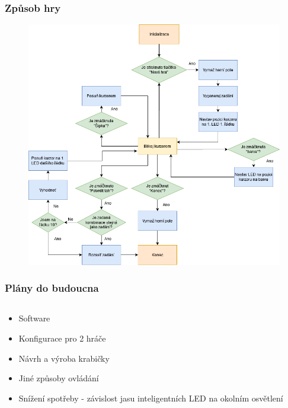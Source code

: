 \documentclass[%
  12pt,       				%
	t,                  %
	aspectratio=1610,   %
	unicode,						%
]{beamer}				    	%
\begin{document}
\begin{frame} 
	\frametitle{Způsob hry}
	\begin{figure}%
		\centering
		\includegraphics[width=0.5\columnwidth]{obrazky/vyvojovy_diagram.png}
	\end{figure}%
\end{frame}

\begin{frame} 
	\frametitle{Plány do budoucna}
	\vspace{0.5cm}
	\begin{columns}[T] 								%
		\begin{column}{0.4\textwidth}		%
			\begin{itemize}
				\item Software
				\item Konfigurace pro 2 hráče
				\item Návrh a výroba krabičky
				\item Jiné způsoby ovládání
				\item Snížení spotřeby - závislost jasu inteligentních LED na okolním osvětlení
			\end{itemize}
		\end{column}
		\begin{column}{0.6\textwidth}		%
		\end{column}
	\end{columns}	
\end{frame}
\end{document}

